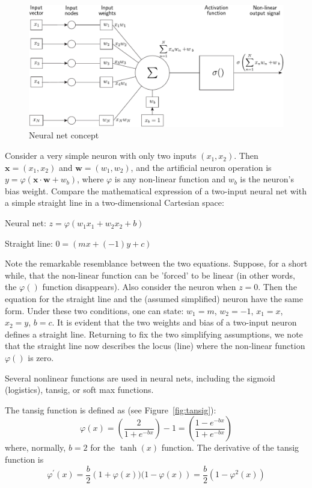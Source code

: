 \begin{figure}[tb]
\centering
\includegraphics[width=\textwidth]{eps/neuralnetconcept}
\caption{Neural net concept\label{fig:neuralnetconcept}}
\end{figure}

Consider a very simple neuron with only two inputs $(x_1,x_2)$.  Then $\bm{x}=(x_1,x_2)$  and  $\bm{w}=(w_1,w_2)$, and the artificial neuron operation is $y = \varphi(\bm{x}\cdot\bm{w}+w_b)$, where $\varphi$  is any non-linear function and  $w_b$ is the neuron's bias weight.  Compare the mathematical expression of a two-input neural net with a simple straight line in a two-dimensional Cartesian space:

Neural net: $z=\varphi(w_1x_1+w_2x_2+b)$

Straight line:  $0=(mx+(-1)y+c)$

Note the remarkable resemblance between the two equations.  Suppose, for a short while, that the non-linear function can be 'forced' to be linear (in other words, the $\varphi()$ function   disappears).  Also consider the neuron when $z=0$.  Then the equation for the straight line and the (assumed simplified) neuron have the same form.  Under these two conditions, one can state: $w_1=m$, $w_2=-1$, $x_1=x$, $x_2=y$, $b=c$.  It is evident that the two weights and bias of a two-input neuron defines a straight line.  Returning to fix the two simplifying assumptions, we note that the straight line now describes the locus (line) where the non-linear function $\varphi()$ is zero.  

Several nonlinear functions are used in neural nets, including the sigmoid (logistics), tansig, or soft max
functions\cite{stackexchangeEllefsen2015,WikiPediaHyperbolicfunction2019,NickBecker2017,DustinStansbury2014,HamzaMahmood2018}. 

The tansig function is defined as (see Figure~\ref{fig:tansig}):
\begin{equation}
\varphi(x)
=\left(\frac{2}{1+e^{-bx}}\right)-1
=\left(\frac{1-e^{-bx}}{1+e^{-bx}}\right)
\end{equation}  
where, normally, $b=2$ for the $\tanh(x)$ function.
The derivative of the tansig function is 
\begin{equation}
 \varphi^\prime(x)
 = \frac{b}{2} \left(1+\varphi(x))(1-\varphi(x)\right)
 = \frac{b}{2}\left(1-\varphi^2(x)\right)
\end{equation}


